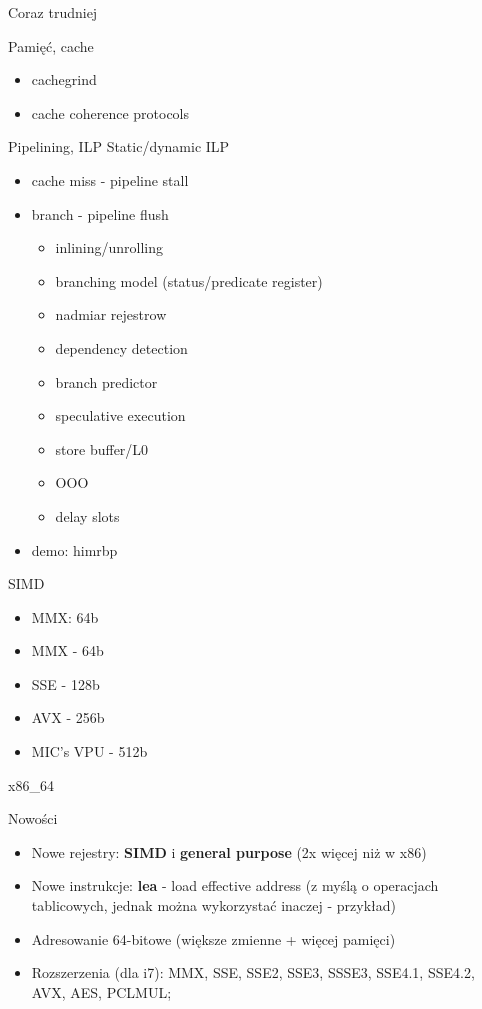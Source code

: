 \begin{frame}{Coraz trudniej}
\begin{block}{Pamięć, cache}
\begin{itemize}
			\item cachegrind
			\item cache coherence protocols
		\end{itemize}
	\end{block}
	\begin{block}{Pipelining, ILP}
		Static/dynamic ILP
		\begin{itemize}
			\item cache miss - pipeline stall
			\item branch - pipeline flush
			\begin{itemize}
				\item inlining/unrolling
				\item branching model (status/predicate register)
				\item nadmiar rejestrow
				\item dependency detection
				\item branch predictor
				\item speculative execution
				\item store buffer/L0
				\item OOO
				\item delay slots
			\end{itemize}
			\item demo: himrbp
		\end{itemize}
	\end{block}
	\begin{block}{SIMD}
		\begin{itemize}
			\item MMX: 64b
			\item MMX - 64b
			\item SSE - 128b
			\item AVX - 256b
			\item MIC's VPU - 512b
		\end{itemize}
	\end{block}
\end{frame}
\begin{frame}[fragile]{x86\_64}
	\begin{block}{Nowości}
		\begin{itemize}
			\item Nowe rejestry: \textbf{SIMD} i \textbf{general purpose} (2x więcej niż w x86)
			\item Nowe instrukcje: \textbf{lea} - load effective address (z myślą o operacjach
			tablicowych, jednak można wykorzystać inaczej - przykład)
			\item Adresowanie 64-bitowe (większe zmienne + więcej pamięci)
			\item Rozszerzenia (dla i7): MMX, SSE, SSE2, SSE3, SSSE3, SSE4.1, SSE4.2, AVX, AES, PCLMUL;
		\end{itemize}
	\end{block}
\end{frame}
